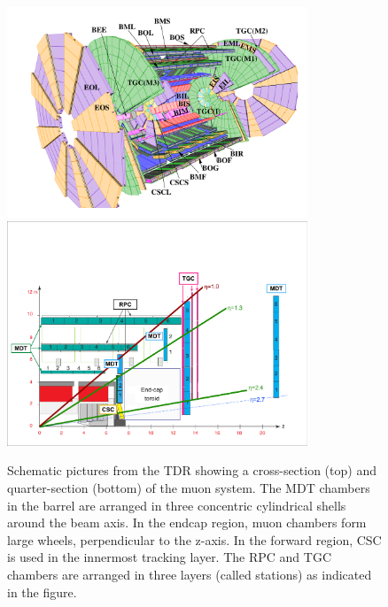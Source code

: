 \begin{figure}
  \begin{center}
    \includegraphics[width=0.80\textwidth]{./figures/TDR_Muon_system_Initial.pdf}
    \includegraphics[width=0.80\textwidth]{./figures/TRIG-2012-03_fig_01.pdf}
    \caption{Schematic pictures from the TDR showing a cross-section (top) and quarter-section (bottom) of the muon system. The MDT chambers in the barrel are arranged in three concentric cylindrical shells around the beam axis. In the endcap region, muon chambers form large wheels, perpendicular to the z-axis. In the forward region, CSC is used in the innermost tracking layer. The RPC and TGC chambers are arranged in three layers (called stations) as indicated in the figure.}
    \label{fig:detector-ms}
  \end{center}
\end{figure}


